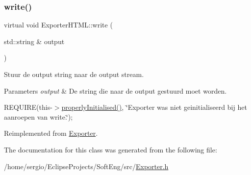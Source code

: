 \mbox{\label{class_exporter_h_t_m_l_aa14cd2dde581c96a0414ad3e886a38c8}} 
\subsubsection{\texorpdfstring{write()}{write()}}
{\footnotesize\ttfamily virtual void Exporter\+H\+T\+M\+L\+::write (\begin{DoxyParamCaption}\item[{std\+::string \&}]{output }\end{DoxyParamCaption})\hspace{0.3cm}{\ttfamily [virtual]}}



Stuur de output string naar de output stream. 


\begin{DoxyParams}{Parameters}
{\em output} & De string die naar de output gestuurd moet worden.\\
\hline
\end{DoxyParams}
R\+E\+Q\+U\+I\+RE(this-\/$>$\hyperlink{class_exporter_afb6185b8276c2fd03da53f49e4da295b}{properly\+Initialised()}, \char`\"{}\+Exporter was niet geinitialiseerd bij het aanroepen van write.\char`\"{});~\newline


Reimplemented from \hyperlink{class_exporter_a96a1f764ef33d11d118f3170a3ca7e1a}{Exporter}.



The documentation for this class was generated from the following file\+:\begin{DoxyCompactItemize}
\item 
/home/sergio/\+Eclipse\+Projects/\+Soft\+Eng/src/\hyperlink{_exporter_8h}{Exporter.\+h}\end{DoxyCompactItemize}
